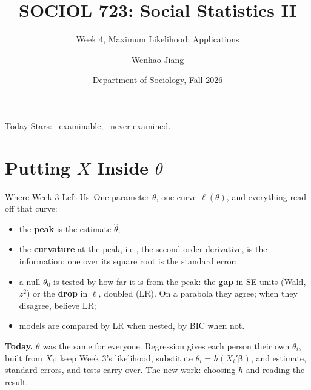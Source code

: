 \documentclass[aspectratio=169,11pt,xcolor=dvipsnames]{beamer}
\title[SOCIOL 723]{SOCIOL 723: Social Statistics II\\[-2pt]}
\subtitle{Week 4, Maximum Likelihood: Applications\\[-6pt]}
\author[Jiang]{Wenhao Jiang\vspace{-2.5em}}
\institute[Duke]{}
\date{Department of Sociology, Fall 2026}
\newcommand{\loglik}{\ell}
\newcommand{\adv}{\,\raisebox{0.6pt}{\textcolor{accent}{$\bigstar$}}}
\newcommand{\core}{\,\raisebox{0.6pt}{\textcolor{corestar}{$\bigstar$}}}
\begin{document}
\begin{frame}[plain]
  \titlepage
\end{frame}

\begin{frame}{Today}
  \tableofcontents
  \vskip6pt
  {\footnotesize Stars: \core{} examinable; \adv{} never examined.}
\end{frame}

\section[X inside theta]{Putting $X$ Inside $\theta$}
\begin{frame}\sectionpage\end{frame}

\begin{frame}{Where Week 3 Left Us\core}
One parameter $\theta$, one curve $\loglik(\theta)$, and everything read
off that curve:
\begin{itemize}\itemsep3pt
  \item the \textbf{peak} is the estimate $\hat\theta$;
  \item the \textbf{curvature} at the peak, i.e., the second-order
        derivative, is the information; one over its square root is the
        standard error;
  \item a null $\theta_0$ is tested by how far it is from the peak: the
        \textbf{gap} in SE units (Wald, $z^2$) or the \textbf{drop} in
        $\loglik$, doubled (LR). On a parabola they agree; when they
        disagree, believe LR;
  \item models are compared by LR when nested, by BIC when not.
\end{itemize}
\vskip4pt
\textbf{Today.} $\theta$ was the same for everyone. Regression gives
\alert{each person their own $\theta_i$}, built from $X_i$: keep Week 3's
likelihood, substitute $\theta_i = h(X_i'\bm\beta)$, and estimate,
standard errors, and tests carry over. The new work: choosing $h$ and
reading the result.
\end{frame}
\end{document}

